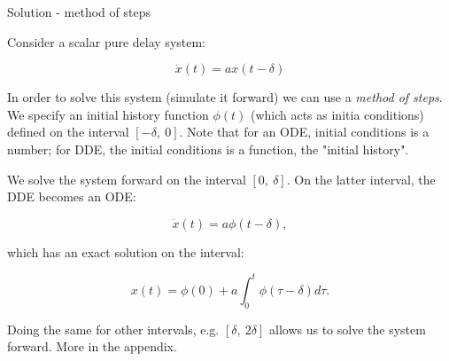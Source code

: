 \documentclass{beamer}
\begin{document}
\begin{frame}{Solution - method of steps}
	\begin{flushleft}
		{\small
		Consider a scalar pure delay system:
		
		\begin{equation}
			\dot{x}(t) = a x(t - \delta)
		\end{equation}
		
		
		In order to solve this system (simulate it forward) we can use a \emph{method of steps}. We specify an initial history function  $\phi(t)$ (which acts as initia conditions) defined on the interval $[ -\delta, \  0]$. Note that for an ODE, initial conditions is a number; for DDE, the initial conditions is a function, the "initial history".
		
		\bigskip
		
		We solve the system forward on the interval $[0, \ \delta]$. On the latter interval, the DDE becomes an ODE:
		
		\begin{equation}
			\dot{x}(t) = a \phi(t - \delta),
		\end{equation}
		
		which has an exact solution on the interval:
		
		\begin{equation}
			x(t) = \phi(0) + a \int_{0}^{t} \phi(\tau - \delta) d \tau.
		\end{equation}
		
		Doing the same for other intervals, e.g. $[\delta, \ 2\delta]$ allows us to solve the system forward. More in the appendix.
		}
	\end{flushleft}
\end{frame}
\end{document}
